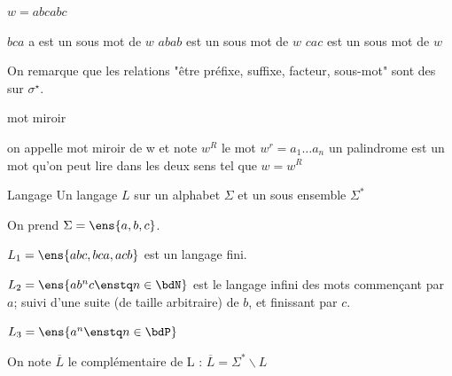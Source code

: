     \begin{example}{}{}
        $w=abcabc$
        \begin{enumerate}
            \itt $bca$ a est un sous mot de $w$
            \itt $abab$ est un sous mot de $w$
            \itt $cac$ est un sous mot de $w$
            
            
        \end{enumerate}
        
        On remarque que les relations "être préfixe, suffixe, facteur, sous-mot" sont des  sur $\sigma^\star$.
        
    \end{example}
    \begin{definition}{mot miroir}{}
        \begin{enumerate}
            \itt on appelle mot miroir de w et note $w^R$
        le mot $w^r =  a_1 \dots a_n$
            \itt un palindrome est un mot qu'on peut lire dans les deux sens tel que $w=w^R$
            
            
            
        \end{enumerate}
        
    \end{definition}
    
    \begin{definition}{Langage}{}
        Un langage $L$ sur un alphabet $\Sigma$ et un sous ensemble $\Sigma^*$ 
    \end{definition}
    
    \begin{example}{}{}
        On prend $\Sigma = \ens{a, b, c}$.
        \begin{enumerate}
            \itt $L_1 = \ens{abc, bca, acb}$ est un langage fini.
            
            \itt $L_2 = \ens{ab^nc \enstq n \in \bdN}$ est le langage infini des mots commençant par $a$; suivi d'une suite (de taille arbitraire) de $b$, et finissant par $c$.
            
            \itt $L_3 = \ens{a^n \enstq n \in \bdP}$
        \end{enumerate}
    \end{example}
    
    \begin{notation}
        On note $\overline{L}$ le complémentaire de L :
        $\overline{L} = \Sigma^* \backslash L$
    \end{notation}
    
